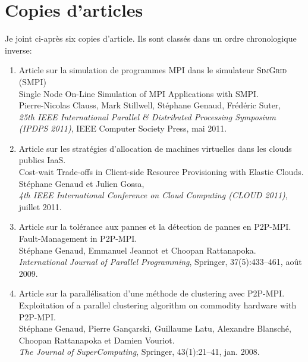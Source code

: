 \documentclass[11pt]{article}
\begin{document}
\section{Copies d'articles}


\vspace{1cm}
Je joint ci-après six copies d'article. Ils sont classés dans un ordre chronologique inverse:

\vspace{1cm}

\begin{enumerate}
\item Article sur la simulation de programmes MPI dans le simulateur \textsc{SimGrid} (SMPI)\\
Single Node On-Line Simulation of MPI Applications with SMPI.\\
Pierre-Nicolas Clauss, Mark Stillwell, Stéphane Genaud, Fr\'ed\'eric Suter,\\
{\em 25th IEEE International Parallel \& Distributed Processing Symposium (IPDPS 2011)}, 
IEEE Computer Society Press, mai 2011.\\

\item Article sur les stratégies d'allocation de machines virtuelles dans les clouds publics IaaS.\\
Cost-wait Trade-offs in Client-side Resource Provisioning with Elastic Clouds.\\
Stéphane Genaud et Julien Gossa,\\
{\em 4th IEEE International Conference on Cloud Computing (CLOUD 2011)}, juillet 2011.\\


\item Article sur la tolérance aux pannes et la détection de pannes en P2P-MPI.\\ 
Fault-Management in P2P-MPI.\\
Stéphane Genaud, Emmanuel Jeannot et Choopan Rattanapoka.\\
{\em International Journal of Parallel Programming}, Springer, 37(5):433--461, août 2009.\\


\item Article sur la parallélisation d'une méthode de clustering avec P2P-MPI.\\
Exploitation of a parallel clustering algorithm on commodity hardware with P2P-MPI.\\
Stéphane Genaud, Pierre Gançarski, Guillaume Latu, Alexandre Blansché, Choopan Rattanapoka et Damien Vouriot.\\
{\em The Journal of SuperComputing}, Springer, 43(1):21--41, jan. 2008.\\



\end{enumerate}
\end{document}

